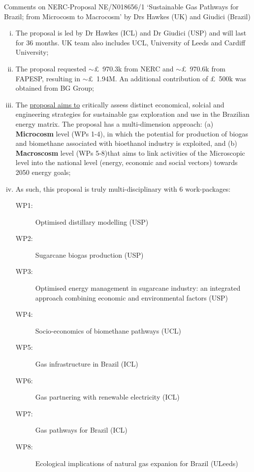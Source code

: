 \documentclass[14pt,twoside]{report}
\begin{document}

\clearpage


\begin{center}
  {\Large Comments on NERC-Proposal NE/N018656/1 `Sustainable Gas Pathways for Brazil; from Microcosm to Macrocosm' by Drs Hawkes (UK) and Giudici (Brazil)}
\end{center}
\begin{enumerate}[(i)]
%
   \item The proposal is led by Dr Hawkes (ICL) and Dr Giudici (USP) and will last for 36 months. UK team also includes UCL, University of Leeds and Cardiff University;
%
   \item The proposal requested $\sim$\pounds~970.3k from NERC and $\sim$\pounds~970.6k from FAPESP, resulting in $\sim$\pounds~1.94M. An additional contribution of \pounds~500k was obtained from BG Group;
%
   \item The \underline{proposal aims to} critically assess distinct economical, solcial and engineering strategies for sustainable gas exploration and use in the Brazilian energy matrix. The proposal has a multi-dimension approach: (a) {\bf Microcosm} level (WPs 1-4), in which the potential for production of biogas and biomethane associated with bioethanol industry is exploited, and (b) {\bf Macroscosm} level (WPs 5-8)that aims to link activities of the Microscopic level into the national level (energy, economic and social vectors) towards 2050 energy goals;
% 
   \item As such, this proposal is truly multi-disciplinary with 6 work-packages:
      \begin{description}
           \item[WP1:] Optimised distillary modelling (USP)
           \item[WP2:] Sugarcane biogas production (USP) 
           \item[WP3:] Optimised energy management in sugarcane industry: an integrated approach combining economic and environmental factors (USP)
           \item[WP4:] Socio-economics of biomethane pathways (UCL)
           \item[WP5:] Gas infrastructure in Brazil (ICL)
           \item[WP6:] Gas partnering with renewable electricity (ICL)
           \item[WP7:] Gas pathways for Brazil (ICL)
           \item[WP8:] Ecological implications of natural gas expanion for Brazil (ULeeds)

\end{description}
\end{enumerate}
\end{document}
